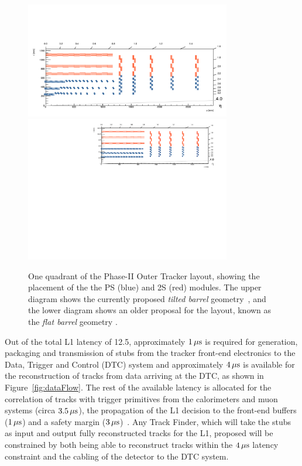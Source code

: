 \begin{figure}[tbp]
\centering
\includegraphics[width=0.8\textwidth,trim={1.1truecm 0truecm 1truecm 12truecm},clip]{figs/tk-upgrade/tiltedbarrelmap.pdf}
\includegraphics[width=0.8\textwidth,trim={0.7truecm 0truecm 1truecm 0truecm},clip]{figs/tk-upgrade/mersilayout.pdf}
\caption{One quadrant of the Phase-II Outer Tracker layout, showing the placement of the the PS (blue) and 2S (red) modules. The upper diagram shows the currently proposed \emph{tilted barrel} geometry~\cite{tiltedGeometry, P2TrackerTDR}, and the lower diagram shows an older proposal for the layout, known as the \emph{flat barrel} geometry \cite{CMS_Upgrade_TP}.}
\label{fig:trackerlayout}
\end{figure}

Out of the total L1 latency of 12.5\mus, approximately $1\,\mu\text{s}$ is required for generation, packaging and transmission of stubs from the tracker front-end electronics to the Data, Trigger and Control (DTC) system and approximately $4\,\mu\text{s}$ is available for the reconstruction of tracks from data arriving at the DTC, as shown in Figure~\ref{fig:dataFlow}.
The rest of the available latency is allocated for the correlation of tracks with trigger primitives from the calorimeters and muon systems (circa $3.5\,\mu\text{s}$), the propagation of the L1 decision to the front-end buffers ($1\,\mu\text{s}$) and a safety margin ($3\,\mu\text{s}$)~\cite{CMS_Upgrade_TP}.
Any Track Finder, which will take the stubs as input and output fully reconstructed tracks for the L1, proposed will be constrained by both being able to reconstruct tracks within the $4\,\mu\text{s}$ latency constraint and the cabling of the detector to the DTC system.

